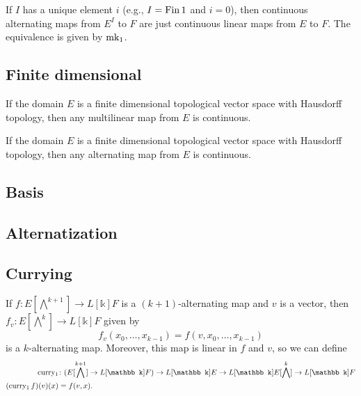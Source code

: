 \begin{definition}
  If \(I\) has a unique element \(i\) (e.g., \(I = \operatorname{Fin} 1\) and \(i = 0\)),
  then continuous alternating maps from \(E^{I}\) to \(F\) are just continuous linear maps from \(E\) to \(F\).
  The equivalence is given by \(\operatorname{mk_1}\).
\end{definition}

\subsection{Finite dimensional}%
\label{sec:finite-dimensional}

\begin{theorem}
  If the domain \(E\) is a finite dimensional topological vector space with Hausdorff topology,
  then any multilinear map from \(E\) is continuous.
\end{theorem}

\begin{theorem}
  If the domain \(E\) is a finite dimensional topological vector space with Hausdorff topology,
  then any alternating map from \(E\) is continuous.
\end{theorem}

\subsection{Basis}%
\label{sec:basis}


\subsection{Alternatization}%
\label{sec:alternatization}


\subsection{Currying}%
\label{sec:currying}

\begin{theorem}
  If \(f\colon E [\bigwedge^{k + 1}]\to L[\mathbb k] F\) is a \((k + 1)\)-alternating map and \(v\) is a vector,
  then \(f_{v}\colon E [\bigwedge^{k}]\to L[\mathbb k] F\) given by
  \[
    f_{v}(x_{0}, \dots, x_{k - 1})=f(v, x_{0}, \dots, x_{k - 1})
  \]
  is a \(k\)-alternating map.
  Moreover, this map is linear in \(f\) and \(v\), so we can define
  \begin{align}
    \curryOne&\colon (E [\bigwedge^{k + 1}]\to L[\mathbb k] F) \to L[\mathbb k] E \to L[\mathbb k] E [\bigwedge^{k}]\to L[\mathbb k] F\\
    (\curryOne f)(v)(x) &= f(v, x).
  \end{align}
\end{theorem}

